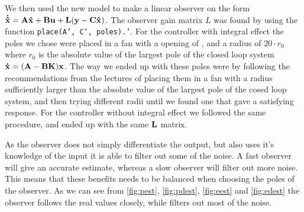 We then used the new model to make a linear observer on the form $\mathbf{\dot{\hat x}} = \mathbf{A}\mathbf{\hat x} + \mathbf{B}\mathbf{u} + \mathbf{L} (\mathbf{y}-\mathbf{C}\mathbf{\hat x})$. The observer gain matrix $L$ was found by using the function \texttt{place(A', C', poles).'}. For the controller with integral effect the poles we chose were placed in a fan with a opening of , and a radius of $20 \cdot r_0$ where $r_0$ is the absolute value of the largest pole of the closed loop system $\mathbf{\dot x} = (\mathbf{A} - \mathbf{B} \mathbf{K}) \mathbf{x}$. The way we ended up with these poles were by following the recommendations from the lectures of placing them in a fan with a radius sufficiently larger than the absolute value of the largest pole of the cosed loop system, and then trying different radii until we found one that gave a satisfying response. For the controller without integral effect we followed the same procedure, and ended up with the same $\mathbf{L}$ matrix.  


As the observer does not simply differentiate the output, but also uses it's knowledge of the input it is able to filter out some of the noise. A fast observer will give an accurate estimate, whereas a slow observer will filter out more noise. This means that these benefits needs to be balanced when choosing the poles of the observer. As we can see from \cref{fig:pest}, \cref{fig:pdest}, \cref{fig:eest} and \cref{fig:edest} the observer follows the real values closely, while filters out most of the noise.


